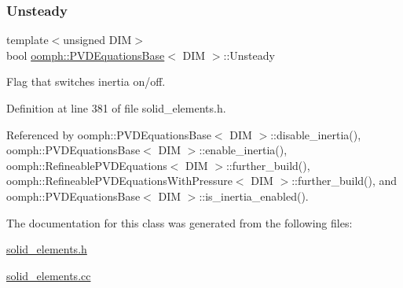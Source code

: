\subsubsection{\texorpdfstring{Unsteady}{Unsteady}}
{\footnotesize\ttfamily template$<$unsigned D\+IM$>$ \\
bool \hyperlink{classoomph_1_1PVDEquationsBase}{oomph\+::\+P\+V\+D\+Equations\+Base}$<$ D\+IM $>$\+::Unsteady\hspace{0.3cm}{\ttfamily [protected]}}



Flag that switches inertia on/off. 



Definition at line 381 of file solid\+\_\+elements.\+h.



Referenced by oomph\+::\+P\+V\+D\+Equations\+Base$<$ D\+I\+M $>$\+::disable\+\_\+inertia(), oomph\+::\+P\+V\+D\+Equations\+Base$<$ D\+I\+M $>$\+::enable\+\_\+inertia(), oomph\+::\+Refineable\+P\+V\+D\+Equations$<$ D\+I\+M $>$\+::further\+\_\+build(), oomph\+::\+Refineable\+P\+V\+D\+Equations\+With\+Pressure$<$ D\+I\+M $>$\+::further\+\_\+build(), and oomph\+::\+P\+V\+D\+Equations\+Base$<$ D\+I\+M $>$\+::is\+\_\+inertia\+\_\+enabled().



The documentation for this class was generated from the following files\+:\begin{DoxyCompactItemize}
\item 
\hyperlink{solid__elements_8h}{solid\+\_\+elements.\+h}\item 
\hyperlink{solid__elements_8cc}{solid\+\_\+elements.\+cc}\end{DoxyCompactItemize}
